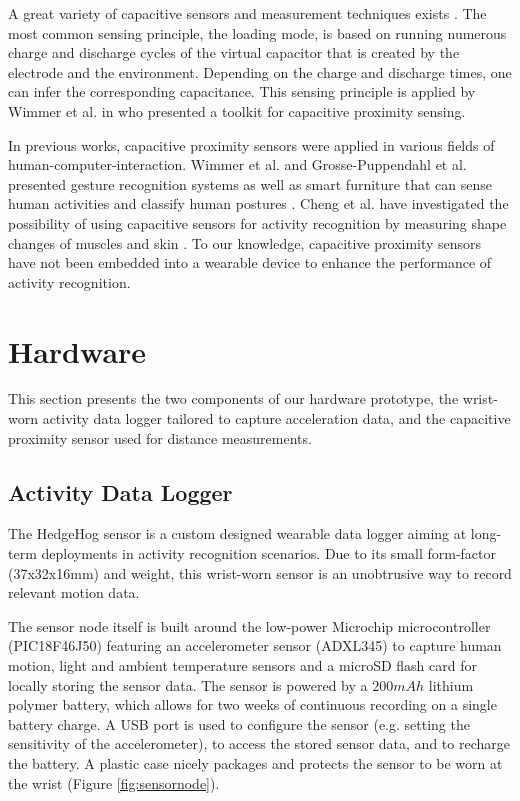 \documentclass[runningheads,a4paper]{llncs}
\begin{document}
A great variety of capacitive sensors and measurement techniques exists \cite{Smith1999}. The most common sensing principle, the loading mode, is based on running numerous charge and discharge cycles of the virtual capacitor that is created by the electrode and the environment. Depending on the charge and discharge times, one can infer the corresponding capacitance. This sensing principle is applied by Wimmer et al. in \cite{Wimmer2007} who presented a toolkit for capacitive proximity sensing.

In previous works, capacitive proximity sensors were applied in various fields of human-computer-interaction. Wimmer et al. and Grosse-Puppendahl et al. presented gesture recognition systems \cite{Wimmer,Grosse-puppendahl2012} as well as smart furniture that can sense human activities \cite{Wimmer} and classify human postures \cite{Grosse-puppendahl2011}. Cheng et al. have investigated the possibility of using capacitive sensors for activity recognition by measuring shape changes of muscles and skin \cite{Cheng2010}. To our knowledge, capacitive proximity sensors have not been embedded into a wearable device to enhance the performance of activity recognition.

\section{Hardware}
\label{sect:hardware}

This section presents the two components of our hardware prototype, the wrist-worn activity data logger tailored to capture acceleration data, and the capacitive proximity sensor used for distance measurements.

\subsection{Activity Data Logger}

The HedgeHog sensor \cite{hedgehog} is a custom designed wearable data logger aiming at long-term deployments in activity recognition scenarios. Due to its small form-factor (37x32x16mm) and weight, this wrist-worn sensor is an unobtrusive way to record relevant motion data.


The sensor node itself is built around the low-power Microchip microcontroller (PIC18F46J50) featuring an accelerometer sensor (ADXL345) to capture human motion, light and ambient temperature sensors and a microSD flash card for locally storing the sensor data. The sensor is powered by a $200mAh$ lithium polymer battery, which allows for two weeks of continuous recording on a single battery charge. A USB port is used to configure the sensor (e.g. setting the sensitivity of the accelerometer), to access the stored sensor data, and to recharge the battery. A plastic case nicely packages and protects the sensor to be worn at the wrist (Figure \ref{fig:sensornode}).
\end{document}
